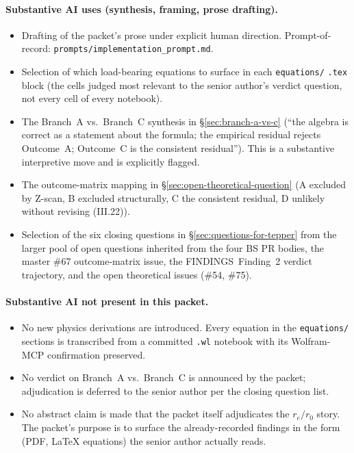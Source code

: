 \paragraph{Substantive AI uses (synthesis, framing, prose drafting).}
\begin{itemize}[topsep=2pt,itemsep=0pt]
  \item Drafting of the packet's prose under explicit human direction.
        Prompt-of-record: \texttt{prompts/implementation\_prompt.md}.
  \item Selection of which load-bearing equations to surface in each
        \texttt{equations/} \texttt{.tex} block (the cells judged most
        relevant to the senior author's verdict question, not every cell of
        every notebook).
  \item The Branch~A vs.~Branch~C synthesis in
        \S\ref{sec:branch-a-vs-c} (``the algebra is correct as a statement
        about the formula; the empirical residual rejects Outcome~A;
        Outcome~C is the consistent residual''). This is a substantive
        interpretive move and is explicitly flagged.
  \item The outcome-matrix mapping in
        \S\ref{sec:open-theoretical-question} (A excluded by Z-scan,
        B excluded structurally, C the consistent residual, D unlikely
        without revising (III.22)).
  \item Selection of the six closing questions in
        \S\ref{sec:questions-for-tepper} from the larger pool of open
        questions inherited from the four BS PR bodies, the master \#67
        outcome-matrix issue, the FINDINGS~Finding~2 verdict trajectory,
        and the open theoretical issues (\#54, \#75).
\end{itemize}

\paragraph{Substantive AI not present in this packet.}
\begin{itemize}[topsep=2pt,itemsep=0pt]
  \item No new physics derivations are introduced. Every equation in the
        \texttt{equations/} sections is transcribed from a committed
        \texttt{.wl} notebook with its Wolfram-MCP confirmation preserved.
  \item No verdict on Branch~A vs.~Branch~C is announced by the packet;
        adjudication is deferred to the senior author per the closing
        question list.
  \item No abstract claim is made that the packet itself adjudicates the
        $r_e/r_0$ story. The packet's purpose is to surface the
        already-recorded findings in the form (PDF, LaTeX equations) the
        senior author actually reads.
\end{itemize}

